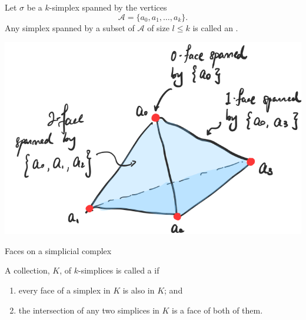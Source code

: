 \documentclass[notoc,notitlepage]{tufte-book}
\begin{document}
\begin{defn}[Face]\label{defn:face}
  Let $\sigma$ be a $k$-simplex spanned by the vertices
  \begin{equation*}
    \mathcal{A} = \{ a_0, a_1, \ldots, a_k \}.
  \end{equation*}
  Any simplex spanned by a subset of $\mathcal{A}$ of size $l \leq k$ is called
  an .
\end{defn}
\begin{marginfigure}
  \centering
  \includegraphics[width=\marginparwidth]{images/faces-on-the-2-simplicial-complex.png}
  \caption{Faces on a simplicial complex}\label{fig:faces_on_a_simplicial_complex}
\end{marginfigure}

\begin{defn}\label{defn:simplicial_complex}
  A collection, $K$, of $k$-simplices is called a 
  if
  \begin{enumerate}
    \item every face of a simplex in $K$ is also in $K$; and
    \item the intersection of any two simplices in $K$ is a face of both of
      them.
  \end{enumerate}
\end{defn}
\end{document}
